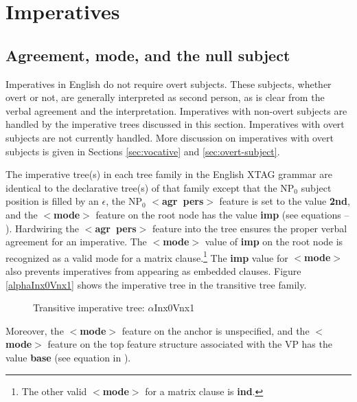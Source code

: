 
\chapter{Imperatives}
\label{imperatives}

\section{Agreement, mode, and the null subject}

Imperatives in English do not require overt subjects.  These subjects, whether
overt or not, are generally interpreted as second person, as is clear from the
verbal agreement and the interpretation. 
Imperatives with non-overt subjects are handled by the
imperative trees discussed in this section.  Imperatives with overt
subjects are not currently handled.  More discussion on imperatives with
overt subjects is given in Sections \ref{sec:vocative} and
\ref{sec:overt-subject}.

The imperative tree(s) in each tree family in the English XTAG grammar are
identical to the declarative tree(s) of that family except that the NP$_{0}$
subject position is filled by an $\epsilon$, the NP$_{0}$ {\bf
$<$agr~pers$>$} feature is set to the value {\bf 2nd}, and the {\bf
$<$mode$>$} feature on the root node has the value {\bf imp} (see equations
 -- ). Hardwiring the {\bf $<$agr~pers$>$} feature into the
tree ensures the proper verbal agreement for an imperative.  The {\bf
$<$mode$>$} value of {\bf imp} on the root node is recognized as a valid
mode for a matrix clause.\footnote{%
%
The other valid {\bf $<$mode$>$} for a matrix clause is {\bf ind}.%
%
} The {\bf imp} value for {\bf $<$mode$>$} also prevents imperatives from
appearing as embedded clauses.  Figure \ref{alphaInx0Vnx1} shows the
imperative tree in the transitive tree family.



\begin{figure}[htbp]
\caption{Transitive imperative tree: $\alpha$Inx0Vnx1}
\label{alphaInx0Vnx1}
\label{2;11,1}
\end{figure}


Moreover, the {\bf $<$mode$>$} feature on the anchor is unspecified, and
the {\bf $<$mode$>$} feature on the top feature structure associated with
the VP has the value {\bf base} (see equation in ).

